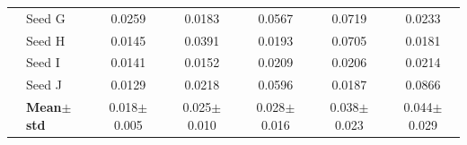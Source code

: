 \begin{table}[H]
{\begin{tabular}{@{}llccccc@{}}
  & Seed G & {\small 0.0259} & {\small 0.0183} & {\small 0.0567} & {\small 0.0719} & {\small 0.0233} \\
  & Seed H & {\small 0.0145} & {\small 0.0391} & {\small 0.0193} & {\small 0.0705} & {\small 0.0181} \\
  & Seed I & {\small 0.0141} & {\small 0.0152} & {\small 0.0209} & {\small 0.0206} & {\small 0.0214} \\
  & Seed J & {\small 0.0129} & {\small 0.0218} & {\small 0.0596} & {\small 0.0187} & {\small 0.0866} \\
 & \textbf{Mean$\pm$std} & \cellcolor{ForestGreen!25}0.018$\pm$0.005 & \cellcolor{ForestGreen!25}0.025$\pm$0.010 & \cellcolor{ForestGreen!25}0.028$\pm$0.016 & \cellcolor{ForestGreen!25}0.038$\pm$0.023 & \cellcolor{ForestGreen!25}0.044$\pm$0.029 \\
\bottomrule
\end{tabular}
}
\end{table}

